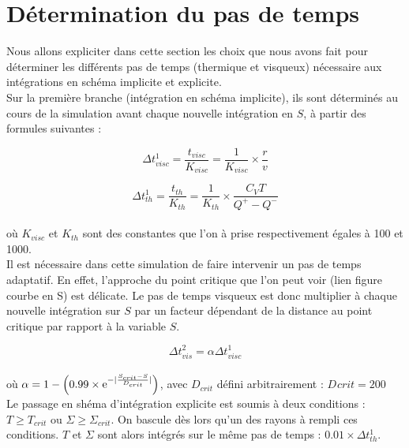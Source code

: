\section{Détermination du pas de temps}
Nous allons expliciter dans cette section les choix que nous avons fait pour déterminer les différents pas de temps 	(thermique et visqueux) nécessaire aux intégrations en schéma implicite et explicite. \\


Sur la première branche (intégration en schéma implicite), ils sont déterminés au cours de la simulation avant chaque nouvelle intégration en $S$, à partir des formules suivantes : 

\begin{equation}
	\Delta t_{visc}^{1} = \frac{t_{visc}}{K_{visc}} = \frac{1}{K_{visc}} \times \frac{r}{v}
\end{equation}

\begin{equation}
	\Delta t_{th}^{1} = \frac{t_{th}}{K_{th}}= \frac{1}{K_{th}} \times \frac{C_{V} T}{Q^{+} - Q^{-}}
\end{equation} \\

où $K_{visc}$ et $K_{th}$ sont des constantes que l'on à prise respectivement égales à 100 et 1000. \\


Il est nécessaire dans cette simulation de faire intervenir un pas de temps adaptatif. En effet, l'approche du point critique que l'on peut voir (lien figure courbe en S) est délicate. Le pas de temps visqueux est donc multiplier
à chaque nouvelle intégration sur $S$ par un facteur dépendant de la distance au point critique par rapport à la variable $S$. 


\begin{equation}
	\Delta t_{vis}^{2} = \alpha \Delta t_{visc}^{1}
\end{equation} \\

où $\alpha = 1 - \left( 0.99 \times \e^{- \lvert \frac{S_{crit} - S}{D_{crit}} \rvert} \right)$, avec $D_{crit}$ défini arbitrairement : $D_{}crit = 200$ \\

Le passage en shéma d'intégration explicite est soumis à deux conditions : $T \ge T_{crit}$ ou $\Sigma \ge \Sigma_{crit}$. On bascule dès lors qu'un des rayons à rempli ces conditions. $T$ et $\Sigma$ sont alors intégrés sur le même pas de temps : $0.01 \times \Delta t_{th}^{1}$.
